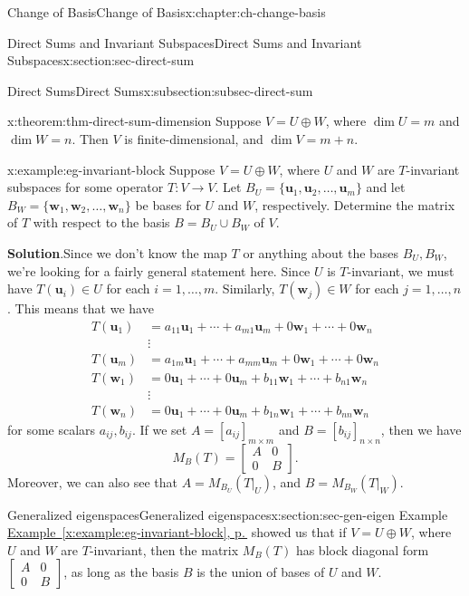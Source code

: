 \documentclass[oneside,10pt,]{book}
\newcommand{\blocktitlefont}{\relax}
\newcommand{\xreffont}{\relax}
\numberwithin{equation}{section}
\newcommand{\bbm}{\begin{bmatrix}}
\newcommand{\ebm}{\end{bmatrix}}
\newcommand{\uu}{\mathbf{u}}
\newcommand{\ww}{\mathbf{w}}
\newcommand{\basis}[2]{\{\mathbf{#1}_1,\mathbf{#1}_2,\ldots,\mathbf{#1}_{#2}\}}
\newcommand{\amp}{&}
\begin{document}
\begin{chapterptx}{Change of Basis}{}{Change of Basis}{}{}{x:chapter:ch-change-basis}
\begin{sectionptx}{Direct Sums and Invariant Subspaces}{}{Direct Sums and Invariant Subspaces}{}{}{x:section:sec-direct-sum}
\begin{subsectionptx}{Direct Sums}{}{Direct Sums}{}{}{x:subsection:subsec-direct-sum}
\begin{theorem}{}{}{x:theorem:thm-direct-sum-dimension}
Suppose \(V=U\oplus W\), where \(\dim U = m\) and \(\dim W = n\). Then \(V\) is finite-dimensional, and \(\dim V = m+n\).%
\end{theorem}
\begin{example}{}{x:example:eg-invariant-block}%
Suppose \(V=U\oplus W\), where \(U\) and \(W\) are \(T\)-invariant subspaces for some operator \(T:V\to V\). Let \(B_U=\basis{u}{m}\) and let \(B_W = \basis{w}{n}\) be bases for \(U\) and \(W\), respectively. Determine the matrix of \(T\) with respect to the basis \(B=B_U\cup B_W\) of \(V\).%
\par\smallskip%
\noindent\textbf{\blocktitlefont Solution}.\label{g:solution:idm45936164753056}{}\hypertarget{g:solution:idm45936164753056}{}\quad{}Since we don't know the map \(T\) or anything about the bases \(B_U,B_W\), we're looking for a fairly general statement here. Since \(U\) is \(T\)-invariant, we must have \(T(\uu_i)\in U\) for each \(i=1,\ldots, m\). Similarly, \(T(\ww_j)\in W\) for each \(j=1,\ldots, n\). This means that we have%
\begin{align*}
T(\uu_1) \amp = a_{11}\uu_1 + \cdots + a_{m1}\uu_m + 0\ww_1+\cdots + 0\ww_n\\
\amp \vdots \\
T(\uu_m) \amp = a_{1m}\uu_1 + \cdots + a_{mm}\uu_m+0\ww_1+\cdots + 0\ww_n\\
T(\ww_1) \amp = 0\uu_1 + \cdots + 0\uu_m+b_{11}\ww_1 + \cdots + b_{n1}\ww_n \\
\amp \vdots \\
T(\ww_n) \amp = 0\uu_1 + \cdots + 0\uu_m+b_{1n}\ww_1 + \cdots + b_{nn}\ww_n
\end{align*}
for some scalars \(a_{ij},b_{ij}\). If we set \(A = [a_{ij}]_{m\times m}\) and \(B = [b_{ij}]_{n\times n}\), then we have%
\begin{equation*}
M_B(T) = \bbm A \amp 0\\0\amp B\ebm\text{.}
\end{equation*}
Moreover, we can also see that \(A = M_{B_U}(T|_U)\), and \(B = M_{B_W}(T|_W)\).%
\end{example}
\end{subsectionptx}
\end{sectionptx}
%
%
\typeout{************************************************}
\typeout{************************************************}
%
\begin{sectionptx}{Generalized eigenspaces}{}{Generalized eigenspaces}{}{}{x:section:sec-gen-eigen}
Example \hyperref[x:example:eg-invariant-block]{Example~{\xreffont\ref{x:example:eg-invariant-block}}, p.\,\pageref{x:example:eg-invariant-block}} showed us that if \(V=U\oplus W\), where \(U\) and \(W\) are \(T\)-invariant, then the matrix \(M_B(T)\) has block diagonal form \(\bbm A \amp 0\\0\amp B\ebm\), as long as the basis \(B\) is the union of bases of \(U\) and \(W\).%

\end{sectionptx}
\end{chapterptx}
\end{document}
